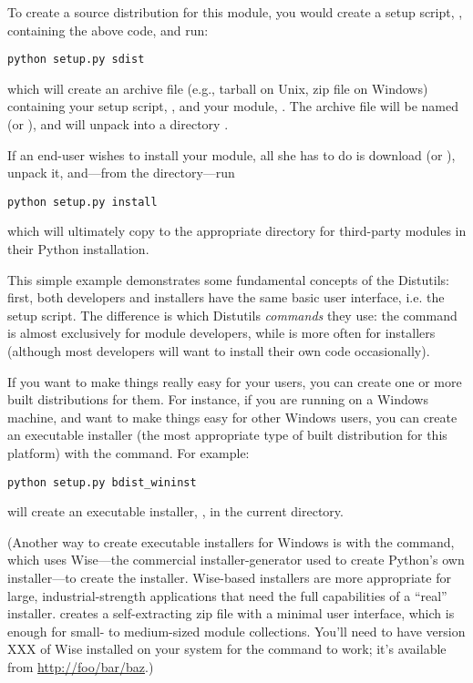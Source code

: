 \documentclass{howto}
\begin{document}
To create a source distribution for this module, you would create a
setup script, , containing the above code, and run:
\begin{verbatim}
python setup.py sdist
\end{verbatim}
which will create an archive file (e.g., tarball on Unix, zip file on
Windows) containing your setup script, , and your module,
.  The archive file will be named  (or
), and will unpack into a directory .

If an end-user wishes to install your  module, all she has
to do is download  (or ), unpack it,
and---from the  directory---run
\begin{verbatim}
python setup.py install
\end{verbatim}
which will ultimately copy  to the appropriate directory
for third-party modules in their Python installation.

This simple example demonstrates some fundamental concepts of the
Distutils: first, both developers and installers have the same basic
user interface, i.e. the setup script.  The difference is which
Distutils \emph{commands} they use: the  command is
almost exclusively for module developers, while  is
more often for installers (although most developers will want to install
their own code occasionally).

If you want to make things really easy for your users, you can create
one or more built distributions for them.  For instance, if you are
running on a Windows machine, and want to make things easy for other
Windows users, you can create an executable installer (the most
appropriate type of built distribution for this platform) with the
 command.  For example:
\begin{verbatim}
python setup.py bdist_wininst
\end{verbatim}
will create an executable installer, , in the
current directory.

(Another way to create executable installers for Windows is with the
 command, which uses Wise---the commercial
installer-generator used to create Python's own installer---to create
the installer.  Wise-based installers are more appropriate for large,
industrial-strength applications that need the full capabilities of a
``real'' installer.   creates a self-extracting
zip file with a minimal user interface, which is enough for small- to
medium-sized module collections.  You'll need to have version XXX of
Wise installed on your system for the  command to
work; it's available from \url{http://foo/bar/baz}.)
\end{document}
